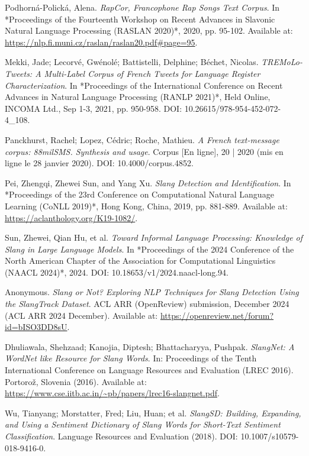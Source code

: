 \documentclass[12pt]{article}
\begin{document}
\begin{thebibliography}{9}
Podhorná-Polická, Alena.
\textit{RapCor, Francophone Rap Songs Text Corpus}.  
In *Proceedings of the Fourteenth Workshop on Recent Advances in Slavonic Natural Language Processing (RASLAN 2020)*, 2020, pp. 95-102.  
Available at: \url{https://nlp.fi.muni.cz/raslan/raslan20.pdf#page=95}.  %

Mekki, Jade; Lecorvé, Gwénolé; Battistelli, Delphine; Béchet, Nicolas.
\textit{TREMoLo-Tweets: A Multi-Label Corpus of French Tweets for Language Register Characterization}.  
In *Proceedings of the International Conference on Recent Advances in Natural Language Processing (RANLP 2021)*, Held Online, INCOMA Ltd., Sep 1-3, 2021, pp. 950-958.  
DOI: 10.26615/978-954-452-072-4\_108.

Panckhurst, Rachel; Lopez, Cédric; Roche, Mathieu.
\textit{A French text-message corpus: 88milSMS. Synthesis and usage}.  
Corpus [En ligne], 20 | 2020 (mis en ligne le 28 janvier 2020).  
DOI: 10.4000/corpus.4852.

Pei, Zhengqi, Zhewei Sun, and Yang Xu.  
\textit{Slang Detection and Identification}.  
In *Proceedings of the 23rd Conference on Computational Natural Language Learning (CoNLL 2019)*, Hong Kong, China, 2019, pp. 881-889.  
Available at: \url{https://aclanthology.org/K19-1082/}.  %

Sun, Zhewei, Qian Hu, et al.  
\textit{Toward Informal Language Processing: Knowledge of Slang in Large Language Models}.  
In *Proceedings of the 2024 Conference of the North American Chapter of the Association for Computational Linguistics (NAACL 2024)*, 2024.  
DOI: 10.18653/v1/2024.naacl-long.94.

Anonymous.
\textit{Slang or Not? Exploring NLP Techniques for Slang Detection Using the SlangTrack Dataset}.  
ACL ARR (OpenReview) submission, December 2024 (ACL ARR 2024 December).  
Available at: \url{https://openreview.net/forum?id=bISO3DD8sU}.

Dhuliawala, Shehzaad; Kanojia, Diptesh; Bhattacharyya, Pushpak.
\textit{SlangNet: A WordNet like Resource for Slang Words}.  
In: Proceedings of the Tenth International Conference on Language Resources and Evaluation (LREC 2016).  
Portorož, Slovenia (2016).  
Available at: \url{https://www.cse.iitb.ac.in/~pb/papers/lrec16-slangnet.pdf}.

Wu, Tianyang; Morstatter, Fred; Liu, Huan; et al.
\textit{SlangSD: Building, Expanding, and Using a Sentiment Dictionary of Slang Words for Short-Text Sentiment Classification}.  
Language Resources and Evaluation (2018).  
DOI: 10.1007/s10579-018-9416-0.


\end{thebibliography}
\end{document}
